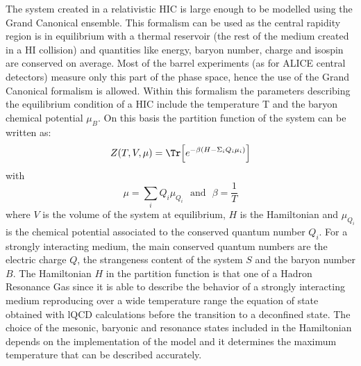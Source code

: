 The system created in a relativistic HIC is large enough to be modelled using the Grand Canonical
ensemble. 
This formalism can be used as the central rapidity region is in equilibrium with a thermal reservoir 
(the rest of the medium created in a HI collision) and quantities like energy, baryon number, 
charge and isospin are conserved on average. Most of the barrel experiments (as for ALICE central
detectors) measure only this part of the phase space, hence the use of the Grand Canonical formalism 
is allowed.
Within this formalism the parameters describing the equilibrium condition of a HIC
include the temperature T and the baryon chemical potential $\mu_{B}$. On this basis 
the partition function of the system can be written as:
\begin{equation} \label{eq:partfunction}
    Z(T,V,\mu) = \Tr \Big[ e^{-\beta(H-\Sigma_{i}Q_{i}\mu_{i})} \Big]
\end{equation}
with
\begin{equation}
    \mu = \sum_{i} Q_{i} \mu_{Q_{i}} \ \ \ \mathrm{and} \ \ \ \beta = \frac{1}{T}
\end{equation}
where $V$ is the volume of the system at equilibrium, $H$ is the
Hamiltonian and $\mu_{Q_{i}}$ is the chemical potential associated to the conserved quantum number
$Q_{i}$.
For a strongly interacting medium, the main conserved quantum numbers are the electric charge $Q$,
the strangeness content of the system $S$ and the baryon number $B$.
The Hamiltonian $H$ in the partition function is that one of a Hadron Resonance Gas since it is able 
to describe the behavior of a strongly interacting medium reproducing over a wide temperature range
the equation of state obtained with lQCD calculations before the transition to a deconfined state.
The choice of the mesonic, baryonic and resonance states included in the Hamiltonian depends on the
implementation of the model and it determines the maximum temperature that can be described accurately.

